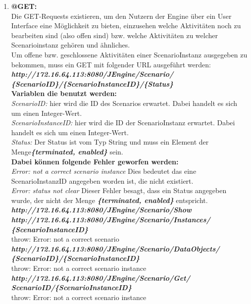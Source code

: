 \documentclass{acm_proc_article-sp}
\begin{document}
\begin{enumerate}
\item \textbf{@GET:}\\
Die GET-Requests existieren, um den Nutzern der Engine über ein User Interface eine Möglichkeit zu bieten, einzusehen welche Aktivitäten noch zu bearbeiten sind (also offen sind) bzw. welche Aktivitäten zu welcher Scenarioinstanz gehören und ähnliches. \\

Um offene bzw. geschlossene Aktivitäten einer ScenarioInstanz ausgegeben zu bekommen, muss ein GET mit folgender URL ausgeführt werden:\\
\textbf{\textit{http://172.16.64.113:8080/JEngine/Scenario/\\\{ScenarioID\}/\{ScenarioInstanceID\}/\{Status\}}}\\
\textbf{Variablen die benutzt werden:}\\
\textit{ScenarioID:} hier wird die ID des Scenarios erwartet. Dabei handelt es sich um einen Integer-Wert.\\
\textit{ScenarioInstanceID:} hier wird die ID der ScenarioInstanz erwartet. Dabei handelt es sich um einen Integer-Wert.\\
\textit{Status:} Der Status ist vom Typ String und muss ein Element der Menge\textbf{\textit{\{terminated, enabled\}}} sein.\\

\textbf{Dabei können folgende Fehler geworfen werden:}\\
\textit{Error: not a correct scenario instance} Dies bedeutet das eine ScenarioInstanzID angegeben worden ist, die nicht existiert.\\
\textit{Error: status not clear} Dieser Fehler besagt, dass ein Status angegeben wurde, der nicht der Menge \textbf{\textit{\{terminated, enabled\}}} entspricht.\\

\textbf{\textit{http://172.16.64.113:8080/JEngine/Scenario/Show}}\\
\textbf{\textit{http://172.16.64.113:8080/JEngine/Scenario/Instances/\\\{ScenarioInstanceID\}}}\\
throw: Error: not a correct scenario\\
\textbf{\textit{http://172.16.64.113:8080/JEngine/Scenario/DataObjects/\\\{ScenarioID\}/\{ScenarioInstanceID\}}}\\
throw: Error: not a correct scenario instance\\
\textbf{\textit{http://172.16.64.113:8080/JEngine/Scenario/Get/\\ScenarioID/\{ScenarioInstanceID\}}}\\
throw: Error: not a correct scenario instance\\\\


\end{enumerate}
\end{document}
